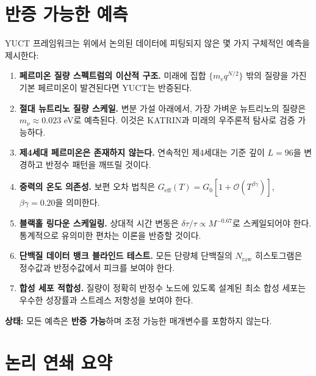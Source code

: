 \documentclass[12pt,a4paper]{article}
\begin{document}
	\section{반증 가능한 예측}
	\label{sec:predictions}
	
	YUCT 프레임워크는 위에서 논의된 데이터에 피팅되지 않은 몇 가지 구체적인 예측을 제시한다:
	
	\begin{enumerate}
		\item \textbf{페르미온 질량 스펙트럼의 이산적 구조.} 미래에 집합 \(\{m_e q^{N/2}\}\) 밖의 질량을 가진 기본 페르미온이 발견된다면 YUCT는 반증된다.
		\item \textbf{절대 뉴트리노 질량 스케일.} 변분 가설 아래에서, 가장 가벼운 뉴트리노의 질량은 \(m_{\nu} \approx 0.023\) eV로 예측된다. 이것은 KATRIN과 미래의 우주론적 탐사로 검증 가능하다.
		\item \textbf{제4세대 페르미온은 존재하지 않는다.} 연속적인 제4세대는 기준 깊이 \(L = 96\)을 변경하고 반정수 패턴을 깨뜨릴 것이다.
		\item \textbf{중력의 온도 의존성.} 보편 오차 법칙은 \(G_{\mathrm{eff}}(T) = G_0[1 + \mathcal{O}(T^{\beta\gamma})]\), \(\beta\gamma = 0.20\)을 의미한다.
		\item \textbf{블랙홀 링다운 스케일링.} 상대적 시간 변동은 \(\delta\tau/\tau \propto M^{-0.67}\)로 스케일되어야 한다. 통계적으로 유의미한 편차는 이론을 반증할 것이다.
		\item \textbf{단백질 데이터 뱅크 블라인드 테스트.} 모든 단량체 단백질의 \(N_{\mathrm{raw}}\) 히스토그램은 정수값과 반정수값에서 피크를 보여야 한다.
		\item \textbf{합성 세포 적합성.} 질량이 정확히 반정수 노드에 있도록 설계된 최소 합성 세포는 우수한 성장률과 스트레스 저항성을 보여야 한다.
	\end{enumerate}
	
	\textbf{상태:} 모든 예측은 \textbf{반증 가능}하며 조정 가능한 매개변수를 포함하지 않는다.
	
	\section*{논리 연쇄 요약}
	
\end{document}

